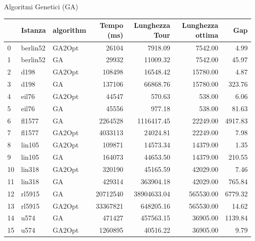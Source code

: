 \documentclass{beamer}
\begin{document}
\begin{frame}{Algoritmi Genetici (GA)}
\begin{table}[H]
        \begin{tabular}{lllrrrr}
            \toprule
               & Istanza  & algorithm & Tempo (ms) & Lunghezza Tour & Lunghezza ottima & Gap     \\
            \midrule
            0  & berlin52 & GA2Opt    & 26104      & 7918.09        & 7542.00          & 4.99    \\
            1  & berlin52 & GA        & 29932      & 11009.32       & 7542.00          & 45.97   \\
            2  & d198     & GA2Opt    & 108498     & 16548.42       & 15780.00         & 4.87    \\
            3  & d198     & GA        & 137106     & 66868.76       & 15780.00         & 323.76  \\
            4  & eil76    & GA2Opt    & 44547      & 570.63         & 538.00           & 6.06    \\
            5  & eil76    & GA        & 45556      & 977.18         & 538.00           & 81.63   \\
            6  & fl1577   & GA        & 2264528    & 1116417.45     & 22249.00         & 4917.83 \\
            7  & fl1577   & GA2Opt    & 4033113    & 24024.81       & 22249.00         & 7.98    \\
            8  & lin105   & GA2Opt    & 109871     & 14573.34       & 14379.00         & 1.35    \\
            9  & lin105   & GA        & 164073     & 44653.50       & 14379.00         & 210.55  \\
            10 & lin318   & GA2Opt    & 320190     & 45165.59       & 42029.00         & 7.46    \\
            11 & lin318   & GA        & 429314     & 363904.18      & 42029.00         & 765.84  \\
            12 & rl5915   & GA        & 20712540   & 38904633.04    & 565530.00        & 6779.32 \\
            13 & rl5915   & GA2Opt    & 33367821   & 648205.16      & 565530.00        & 14.62   \\
            14 & u574     & GA        & 471427     & 457563.15      & 36905.00         & 1139.84 \\
            15 & u574     & GA2Opt    & 1260895    & 40516.22       & 36905.00         & 9.79    \\
            \bottomrule
        \end{tabular}
    \end{table}
\end{frame}
\end{document}
